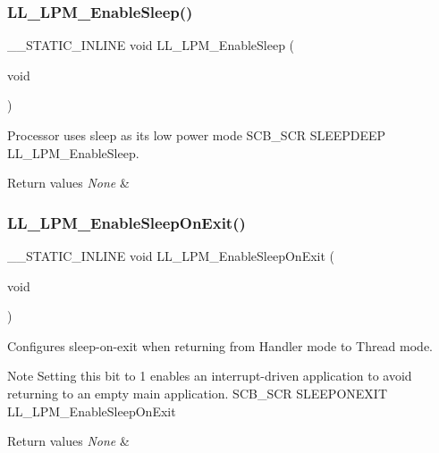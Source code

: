 \subsubsection{\texorpdfstring{L\+L\+\_\+\+L\+P\+M\+\_\+\+Enable\+Sleep()}{LL\_LPM\_EnableSleep()}}
{\footnotesize\ttfamily \+\_\+\+\_\+\+S\+T\+A\+T\+I\+C\+\_\+\+I\+N\+L\+I\+NE void L\+L\+\_\+\+L\+P\+M\+\_\+\+Enable\+Sleep (\begin{DoxyParamCaption}\item[{void}]{ }\end{DoxyParamCaption})}



Processor uses sleep as its low power mode  S\+C\+B\+\_\+\+S\+CR S\+L\+E\+E\+P\+D\+E\+EP L\+L\+\_\+\+L\+P\+M\+\_\+\+Enable\+Sleep. 


\begin{DoxyRetVals}{Return values}
{\em None} & \\
\hline
\end{DoxyRetVals}
\mbox{\label{group___c_o_r_t_e_x___l_l___e_f___l_o_w___p_o_w_e_r___m_o_d_e_gabb2b2648dff19d88209af8761fc34c30}} 
\subsubsection{\texorpdfstring{L\+L\+\_\+\+L\+P\+M\+\_\+\+Enable\+Sleep\+On\+Exit()}{LL\_LPM\_EnableSleepOnExit()}}
{\footnotesize\ttfamily \+\_\+\+\_\+\+S\+T\+A\+T\+I\+C\+\_\+\+I\+N\+L\+I\+NE void L\+L\+\_\+\+L\+P\+M\+\_\+\+Enable\+Sleep\+On\+Exit (\begin{DoxyParamCaption}\item[{void}]{ }\end{DoxyParamCaption})}



Configures sleep-\/on-\/exit when returning from Handler mode to Thread mode. 

\begin{DoxyNote}{Note}
Setting this bit to 1 enables an interrupt-\/driven application to avoid returning to an empty main application.  S\+C\+B\+\_\+\+S\+CR S\+L\+E\+E\+P\+O\+N\+E\+X\+IT L\+L\+\_\+\+L\+P\+M\+\_\+\+Enable\+Sleep\+On\+Exit 
\end{DoxyNote}

\begin{DoxyRetVals}{Return values}
{\em None} & \\
\hline
\end{DoxyRetVals}
